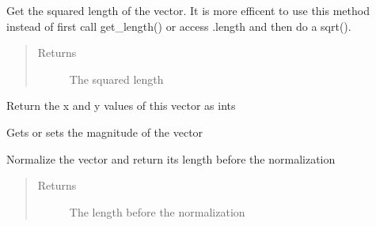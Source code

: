 \documentclass[letterpaper,10pt,english]{sphinxmanual}
\begin{document}
\begin{fulllineitems}
\begin{fulllineitems}
\end{fulllineitems}


\begin{fulllineitems}
\label{geometry:serge.simplevecs.Vec2d.get_length_sqrd}
Get the squared length of the vector.
It is more efficent to use this method instead of first call 
get\_length() or access .length and then do a sqrt().
\begin{quote}\begin{description}
\item[{Returns}] \leavevmode
The squared length

\end{description}\end{quote}

\end{fulllineitems}


\begin{fulllineitems}
\label{geometry:serge.simplevecs.Vec2d.int_tuple}
Return the x and y values of this vector as ints

\end{fulllineitems}


\begin{fulllineitems}
\label{geometry:serge.simplevecs.Vec2d.length}
Gets or sets the magnitude of the vector

\end{fulllineitems}


\begin{fulllineitems}
\label{geometry:serge.simplevecs.Vec2d.normalize_return_length}
Normalize the vector and return its length before the normalization
\begin{quote}\begin{description}
\item[{Returns}] \leavevmode
The length before the normalization

\end{description}\end{quote}


\end{fulllineitems}
\end{fulllineitems}
\end{document}
